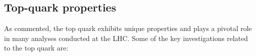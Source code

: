 






\subsection{Top-quark properties}
As commented, the top quark exhibits unique properties and plays a pivotal role in many analyses conducted at the LHC. 
Some of the key investigations related to the top quark are:

